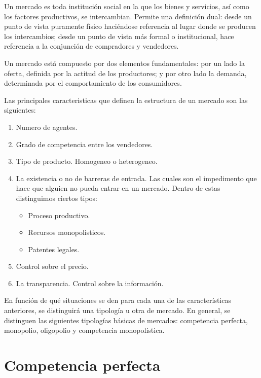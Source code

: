 \documentclass[
]{book}
\providecommand{\tightlist}{%
  \setlength{\itemsep}{0pt}\setlength{\parskip}{0pt}}
\begin{document}
Un mercado es toda institución social en la que los bienes y servicios, así como los factores productivos, se intercambian. Permite una definición dual: desde un punto de vista puramente físico haciéndose referencia al lugar donde se producen los intercambios; desde un punto de vista más formal o institucional, hace referencia a la conjunción de compradores y vendedores.

Un mercado está compuesto por dos elementos fundamentales: por un lado la oferta, definida por la actitud de los productores; y por otro lado la demanda, determinada por el comportamiento de los consumidores.

Las principales caracteristicas que definen la estructura de un mercado son las siguientes:

\begin{enumerate}
\def\labelenumi{\arabic{enumi}.}
\tightlist
\item
  Numero de agentes.
\item
  Grado de competencia entre los vendedores.
\item
  Tipo de producto. Homogeneo o heterogeneo.
\item
  La existencia o no de barreras de entrada. Las cuales son el impedimento que hace que alguien no pueda entrar en un mercado. Dentro de estas distinguimos ciertos tipos:

  \begin{itemize}
  \tightlist
  \item
    Proceso productivo.
  \item
    Recursos monopolisticos.
  \item
    Patentes legales.
  \end{itemize}
\item
  Control sobre el precio.
\item
  La transparencia. Control sobre la información.
\end{enumerate}

En función de qué situaciones se den para cada una de las características anteriores, se distinguirá una tipología u otra de mercado. En general, se distinguen las siguientes tipologías básicas de mercados: competencia perfecta, monopolio, oligopolio y competencia monopolística.

\hypertarget{competencia-perfecta}{%
\section{Competencia perfecta}\label{competencia-perfecta}}
\end{document}
